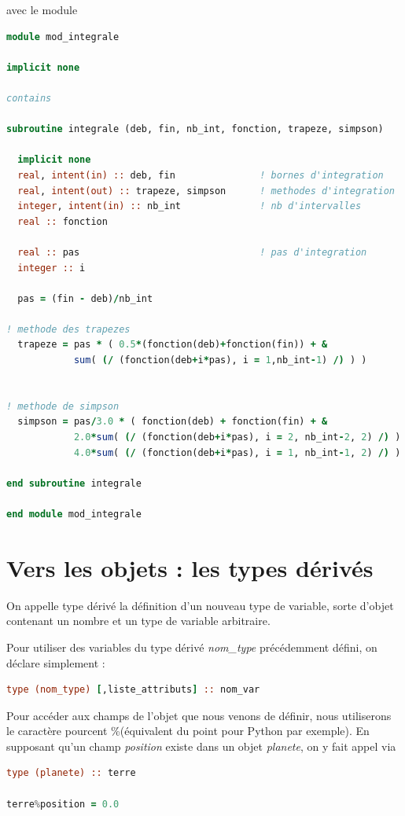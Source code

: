 \documentclass[a4paper,twoside]{article}
\begin{document}
avec le module
\begin{lstlisting}[language=Fortran]
module mod_integrale

implicit none

contains

subroutine integrale (deb, fin, nb_int, fonction, trapeze, simpson)

  implicit none
  real, intent(in) :: deb, fin               ! bornes d'integration
  real, intent(out) :: trapeze, simpson      ! methodes d'integration
  integer, intent(in) :: nb_int              ! nb d'intervalles    
  real :: fonction

  real :: pas                                ! pas d'integration
  integer :: i

  pas = (fin - deb)/nb_int

! methode des trapezes
  trapeze = pas * ( 0.5*(fonction(deb)+fonction(fin)) + &
            sum( (/ (fonction(deb+i*pas), i = 1,nb_int-1) /) ) ) 


! methode de simpson
  simpson = pas/3.0 * ( fonction(deb) + fonction(fin) + &
            2.0*sum( (/ (fonction(deb+i*pas), i = 2, nb_int-2, 2) /) ) + &
            4.0*sum( (/ (fonction(deb+i*pas), i = 1, nb_int-1, 2) /) ) )

end subroutine integrale

end module mod_integrale
\end{lstlisting}






\section{Vers les objets : les types dérivés}
On appelle type dérivé la définition d'un nouveau type de variable, sorte d'objet contenant un nombre et un type de variable arbitraire. 

\bigskip

Pour utiliser des variables du type dérivé \textit{nom\_type} précédemment défini, on déclare simplement :
\begin{lstlisting}[language=Fortran]
type (nom_type) [,liste_attributs] :: nom_var
\end{lstlisting}

\begin{remarque}
Pour accéder aux champs de l'objet que nous venons de définir, nous utiliserons le caractère pourcent \og \%\fg (équivalent du point pour Python par exemple). En supposant qu'un champ \textit{position} existe dans un objet \textit{planete}, on y fait appel via
\begin{lstlisting}[language=Fortran]
type (planete) :: terre

terre%position = 0.0
\end{lstlisting}
\end{remarque}
\end{document}
